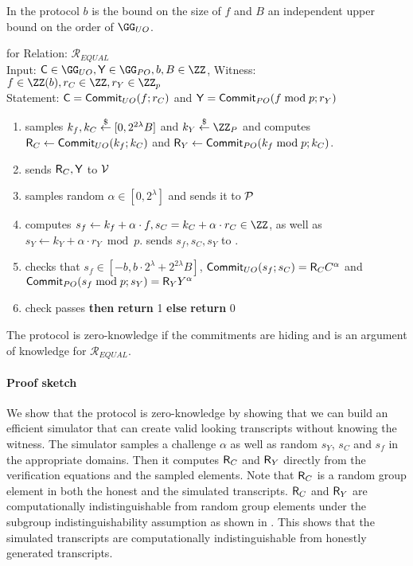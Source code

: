 In the protocol $b$ is the bound on the size of $f$ and $B$ an independent upper bound on the order of $\GG_{UO}$.
 \noindent\begin{mdframed}[userdefinedwidth=\textwidth]
\begin{minipage}{\textwidth}
	\begin{flushleft}
	 for Relation: $\mathcal{R}_{EQUAL}$\\
	Input: $\gr{C} \in \GG_{UO}, \gr{Y}\in \GG_{PO}, b,B\in \ZZ$, Witness: $f \in \ZZ(b),r_C \in \ZZ,r_Y \in \ZZ_p$\\
	Statement: $\mathsf{C}=\textsf{{Commit}}_{UO}(f;r_C)$ and $\mathsf{Y}=\textsf{{Commit}}_{PO}(f \bmod p;r_Y)$
	\begin{enumerate}[nolistsep]
		    \item \prover samples $k_f,k_C \overset{\$}{\gets} [0,2^{2\lambda} B]$ and $k_Y \sample \ZZ_P$ and computes $\mathsf{R}_C\gets \textsf{{Commit}}_{UO}(k_f;k_C)$ and $\mathsf{R}_Y\gets \textsf{{Commit}}_{PO}(k_f \bmod p;k_C)$.
		    \item \prover sends $\mathsf{R}_C,\mathsf{Y}$ to $\mathcal{V}$
		    \item \verifier samples random $\alpha\in [0,2^\lambda]$ and sends it to $\mathcal{P}$
		    \item \prover computes $s_f\gets k_f + \alpha \cdot f, s_C=k_C+ \alpha \cdot r_C \in \ZZ$, as well as $s_Y\gets k_Y+ \alpha\cdot r_Y \bmod p$. \prover sends $s_f,s_C,s_Y$ to \verifier.
		    \item \verifier checks that $s_f\in [-b,b\cdot 2^{\lambda}+2^{2\lambda}B]$, $\textsf{{Commit}}_{UO}(s_f;s_C)=\mathsf{R}_C C^{\alpha}$ and $\textsf{{Commit}}_{PO}(s_f \bmod p;s_Y)=\mathsf{R}_Y Y^{\alpha}$
		    \item \pcif{}check passes \textbf{then} \textbf{return} 1 \textbf{else} \textbf{return} 0
		\end{enumerate}
	\end{flushleft}
\end{minipage}
\end{mdframed}
 The protocol is zero-knowledge if the commitments are hiding and is an argument of knowledge for $\mathcal{R}_{EQUAL}$.
 \paragraph{Proof sketch}
 We show that the protocol is zero-knowledge by showing that we can build an efficient simulator that can create valid looking transcripts without knowing the witness. The simulator samples a challenge $\alpha$ as well as random $s_Y$, $s_C$ and $s_f$ in the appropriate domains. Then it computes $\mathsf{R}_C$ and $\mathsf{R}_Y$ directly from the verification equations and the sampled elements. Note that $\mathsf{R}_C$ is a random group element in both the honest and the simulated transcripts. $\mathsf{R}_C$ and $\mathsf{R}_Y$ are computationally indistinguishable from random group elements under the subgroup indistinguishability assumption as shown in \cite{AC:DamFuj02,C:BraGol10}. This shows that the simulated transcripts are computationally indistinguishable from honestly generated transcripts.
 
